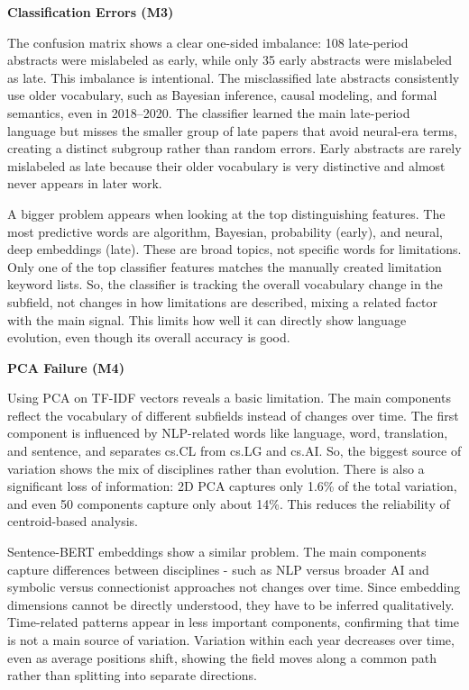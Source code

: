 \textbf{Classification Errors (M3)}

The confusion matrix shows a clear one-sided imbalance: 108 late-period abstracts were mislabeled as early, while only 35 early abstracts were mislabeled as late. This imbalance is intentional. The misclassified late abstracts consistently use older vocabulary, such as Bayesian inference, causal modeling, and formal semantics, even in 2018–2020. The classifier learned the main late-period language but misses the smaller group of late papers that avoid neural-era terms, creating a distinct subgroup rather than random errors. Early abstracts are rarely mislabeled as late because their older vocabulary is very distinctive and almost never appears in later work.

A bigger problem appears when looking at the top distinguishing features. The most predictive words are algorithm, Bayesian, probability (early), and neural, deep embeddings (late). These are broad topics, not specific words for limitations. Only one of the top classifier features matches the manually created limitation keyword lists. So, the classifier is tracking the overall vocabulary change in the subfield, not changes in how limitations are described, mixing a related factor with the main signal. This limits how well it can directly show language evolution, even though its overall accuracy is good.

\textbf{PCA Failure (M4)}

Using PCA on TF-IDF vectors reveals a basic limitation. The main components reflect the vocabulary of different subfields instead of changes over time. The first component is influenced by NLP-related words like language, word, translation, and sentence, and separates cs.CL from cs.LG and cs.AI. So, the biggest source of variation shows the mix of disciplines rather than evolution. There is also a significant loss of information: 2D PCA captures only 1.6\% of the total variation, and even 50 components capture only about 14\%. This reduces the reliability of centroid-based analysis.

Sentence-BERT embeddings show a similar problem. The main components capture differences between disciplines - such as NLP versus broader AI and symbolic versus connectionist approaches not changes over time. Since embedding dimensions cannot be directly understood, they have to be inferred qualitatively. Time-related patterns appear in less important components, confirming that time is not a main source of variation. Variation within each year decreases over time, even as average positions shift, showing the field moves along a common path rather than splitting into separate directions.

